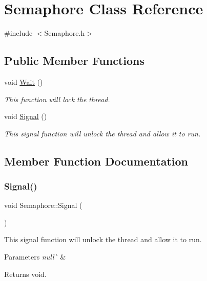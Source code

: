 \hypertarget{class_semaphore}{}\section{Semaphore Class Reference}
\label{class_semaphore}


{\ttfamily \#include $<$Semaphore.\+h$>$}

\subsection*{Public Member Functions}
\begin{DoxyCompactItemize}
\item 
void \mbox{\hyperlink{class_semaphore_a72aabebf026e3a8b1f3e4d0fa8ee1eda}{Wait}} ()
\begin{DoxyCompactList}\small\item\em This function will lock the thread. \end{DoxyCompactList}\item 
void \mbox{\hyperlink{class_semaphore_a86f92f738b4486439b296d8e235895f2}{Signal}} ()
\begin{DoxyCompactList}\small\item\em This signal function will unlock the thread and allow it to run. \end{DoxyCompactList}\end{DoxyCompactItemize}


\subsection{Member Function Documentation}
\mbox{\label{class_semaphore_a86f92f738b4486439b296d8e235895f2}} 
\subsubsection{\texorpdfstring{Signal()}{Signal()}}
{\footnotesize\ttfamily void Semaphore\+::\+Signal (\begin{DoxyParamCaption}{ }\end{DoxyParamCaption})}



This signal function will unlock the thread and allow it to run. 


\begin{DoxyParams}{Parameters}
{\em null\`{}} & \\
\hline
\end{DoxyParams}
\begin{DoxyReturn}{Returns}
void. 
\end{DoxyReturn}
\mbox{\label{class_semaphore_a72aabebf026e3a8b1f3e4d0fa8ee1eda}} 
